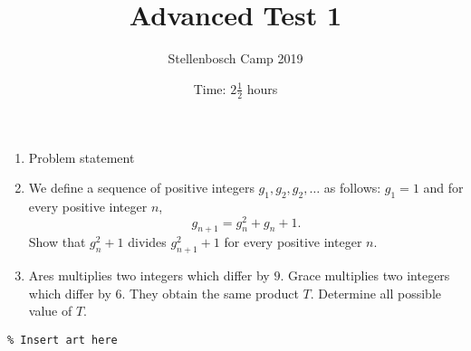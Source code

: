 \documentclass{article}
\title{Advanced Test 1}
\author{Stellenbosch Camp 2019}
\date{Time: $2\frac{1}{2}$ hours}
\begin{document}
\maketitle
\thispagestyle{empty}


\begin{enumerate}[1.]

\item %
Problem statement

\item %
We define a sequence of positive integers $g_1, g_2, g_2, \dotsc$ as follows: $g_1 = 1$ and for every positive integer $n$,
\[ g_{n+1} = g_n^2 +g_n +1. \]
Show that $g_n^2+1$ divides $g_{n+1}^2+1$ for every positive integer $n$.

\item %
Ares multiplies two integers which differ by $9$.
Grace multiplies two integers which differ by $6$.
They obtain the same product $T$.
Determine all possible value of $T$.

\end{enumerate}


\vfill
\begin{center} \begin{verbatim}
% Insert art here
\end{verbatim} \end{center}
\end{document}

